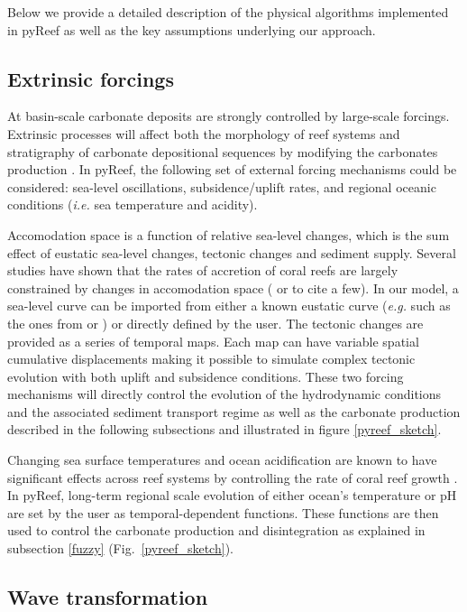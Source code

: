 \documentclass[default,jgrga]{agutex2015}
\begin{document}
\begin{article}
\noindent Below we provide a detailed description of the physical algorithms implemented in pyReef as well as the key assumptions underlying our approach.

\subsection{Extrinsic forcings}

At basin-scale carbonate deposits are strongly controlled by large-scale forcings. Extrinsic processes will affect both the morphology of reef systems and stratigraphy of carbonate depositional sequences by modifying the carbonates production \citep{Hill06}. In pyReef, the following set of external forcing mechanisms could be considered: sea-level oscillations, subsidence/uplift rates, and regional oceanic conditions (\textit{i.e.} sea temperature and acidity).

\noindent Accomodation space is a function of relative sea-level changes, which is the sum effect of eustatic sea-level changes, tectonic changes and sediment supply. Several studies have shown that the rates of accretion of coral reefs are largely constrained by changes in accomodation space (\citet{VanWoesik15} or \citet{Roff15} to cite a few). In our model, a sea-level curve can be imported from either a known eustatic curve (\textit{e.g.} such as the ones from \citet{Haq87} or \citet{Miller05}) or directly defined by the user. The tectonic changes are provided as a series of temporal maps. Each map can have variable spatial cumulative displacements making it possible to simulate complex tectonic evolution with both uplift and subsidence conditions. These two forcing mechanisms will directly control the evolution of the hydrodynamic conditions and the associated sediment transport regime as well as the carbonate production described in the following subsections and illustrated in figure \ref{pyreef_sketch}.

\noindent Changing sea surface temperatures and ocean acidification are known to have significant effects across reef systems by controlling the rate of coral reef growth \citep{Shaw12, Andersson13, Zhang13}. In pyReef, long-term regional scale evolution of either ocean's temperature or pH are set by the user as temporal-dependent functions. These functions are then used to control the carbonate production and disintegration as explained in subsection \ref{fuzzy} (Fig.~\ref{pyreef_sketch}).

\subsection{Wave transformation}


\end{article}
\end{document}
